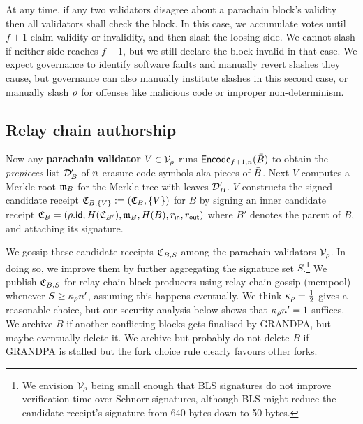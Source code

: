 At any time, if any two validators disagree about a parachain block's validity then all validators shall check the block.  In this case, we accumulate votes until $f+1$ claim validity or invalidity, and then slash the loosing side.  We cannot slash if neither side reaches $f+1$, but we still declare the block invalid in that case.  We expect governance to identify software faults and manually revert slashes they cause, but governance can also manually institute slashes in this second case, or manually slash $\rho$ for offenses like malicious code or improper non-determinism. 


\subsection{Relay chain authorship} %


Now any {\bf parachain validator} $V \in \mathcal{V}_{\rho}$ runs $\mathsf{Encode}_{f+1,n}(\bar{B})$ to obtain the {\em prepieces} list $\mathcal{D}'_B$ of $n$ erasure code symbols aka pieces of $\bar{B}$.  Next $V$ computes a Merkle root $\mathfrak{m}_B$ for the Merkle tree with leaves $\mathcal{D}'_B$.  $V$ constructs the signed candidate receipt $\mathfrak{C}_{B,\{V\}} := (\mathfrak{C}_{B},\{V\})$ for $B$ by signing an inner candidate receipt $\mathfrak{C}_B = (\rho.\mathsf{id},H(\mathfrak{C}_{B'}),\mathfrak{m}_B,H(B),r_{\mathsf{in}},r_{\mathsf{out}})$ where $B'$ denotes the parent of $B$, and attaching its signature.  

We gossip these candidate receipts $\mathfrak{C}_{B,S}$ among the parachain validators $\mathcal{V}_{\rho}$.  In doing so, we improve them by further aggregating the signature set $S$.\footnote{We envision $\mathcal{V}_{\rho}$ being small enough that BLS signatures do not improve verification time over Schnorr signatures, although BLS might reduce the candidate receipt's signature from 640 bytes down to 50 bytes.}  We publish $\mathfrak{C}_{B,S}$ for relay chain block producers using relay chain gossip (mempool) whenever $S \ge \kappa_{\rho} n'$, assuming this happens eventually.  We think $\kappa_{\rho} = {1\over2}$ gives a reasonable choice, but our security analysis below shows that $\kappa_{\rho} n' = 1$ suffices.  We archive $B$ if another conflicting blocks gets finalised by GRANDPA, but maybe eventually delete it.  We archive but probably do not delete $B$ if GRANDPA is stalled but the fork choice rule clearly favours other forks.  

